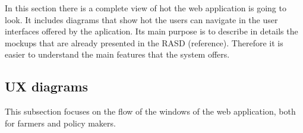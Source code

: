 In this section there is a complete view of hot the web application is going to look. 
It includes diagrams that show hot the users can navigate in the user interfaces offered by the aplication.
Its main purpose is to describe in details the mockups that are already presented in the RASD (reference). Therefore it is easier to understand 
the main features that the system offers.


\subsection{UX diagrams}
This subsection focuses on the flow of the windows of the web application, 
both for farmers and policy makers.

